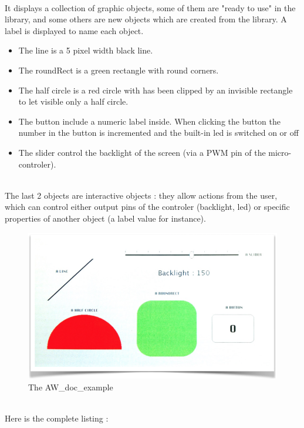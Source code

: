 \documentclass[a4paper,11pt]{extarticle}
\begin{document}
~\\It displays a collection of graphic objects, some of them are "ready to use" in the library, and some others are new objects which are created from the library. A label is displayed to name each object.
\begin{itemize}
  \item The line is a 5 pixel width black line.
  \item The roundRect is a green rectangle with round corners.
  \item The half circle is a red circle with has been clipped by an invisible rectangle to let visible only a half circle.
  \item The button include a numeric label inside. When clicking the button the number in the button is incremented and the built-in led is switched on or off
  \item The slider control the backlight of the screen (via a PWM pin of the micro-controler).
\end{itemize}

  ~\\ The last 2 objects are interactive objects : they allow actions from the user, which can control either output pins of the controler (backlight, led) or specific properties of another object (a label value for instance).
  
\begin{figure}[htbp] %
   \centering
   \includegraphics[width=6in]{AWFig1.png} 
   \caption{The AW\_doc\_example }
   \label{fig:1 }
\end{figure}


~\\Here is the complete listing : 
\end{document}
